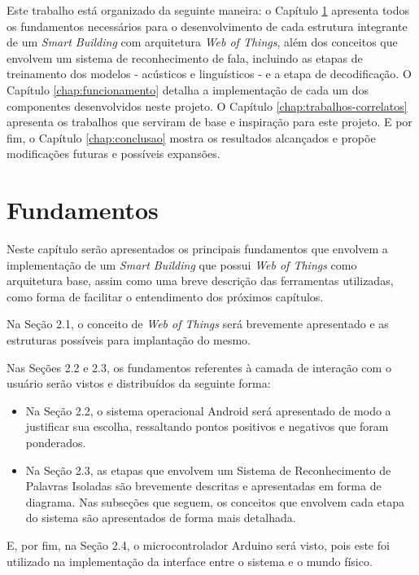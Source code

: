 \documentclass[12pt,a4paper,oneside]{report}
\begin{document}
Este trabalho está organizado da seguinte maneira: o Capítulo \ref{chap:fundamentos} apresenta todos os fundamentos necessários para o desenvolvimento de cada estrutura integrante de um \emph{Smart Building} com arquitetura \emph{Web of Things}, além dos conceitos que envolvem um sistema de reconhecimento de fala, incluindo as etapas de treinamento dos modelos - acústicos e linguísticos - e a etapa de decodificação. O Capítulo \ref{chap:funcionamento} detalha a implementação de cada um dos componentes desenvolvidos neste projeto. O Capítulo \ref{chap:trabalhos-correlatos} apresenta os trabalhos que serviram de base e inspiração para este projeto. E por fim, o Capítulo \ref{chap:conclusao} mostra os resultados alcançados e propõe modificações futuras e possíveis expansões.

\chapter{Fundamentos}
\label{chap:fundamentos}

Neste capítulo serão apresentados os principais fundamentos que envolvem a implementação de um \emph{Smart Building} que possui \emph{Web of Things} como arquitetura base, assim como uma breve descrição das ferramentas utilizadas, como forma de facilitar o entendimento dos próximos capítulos.

Na Seção 2.1, o conceito de \emph{Web of Things} será brevemente apresentado e as estruturas possíveis para implantação do mesmo.

Nas Seções 2.2 e 2.3, os fundamentos referentes à camada de interação com o usuário serão vistos e distribuídos da seguinte forma:
\begin{itemize}
    \item Na Seção 2.2, o sistema operacional Android será apresentado de modo a justificar sua escolha, ressaltando pontos positivos e negativos que foram ponderados.
    \item Na Seção 2.3, as etapas que envolvem um Sistema de Reconhecimento de Palavras Isoladas são brevemente descritas e apresentadas em forma de diagrama. Nas subseções que seguem, os conceitos que envolvem cada etapa do sistema são apresentados de forma mais detalhada.
\end{itemize}

E, por fim, na Seção 2.4, o microcontrolador Arduino será visto, pois este foi utilizado na implementação da interface entre o sistema e o mundo físico.

%
%
\end{document}
